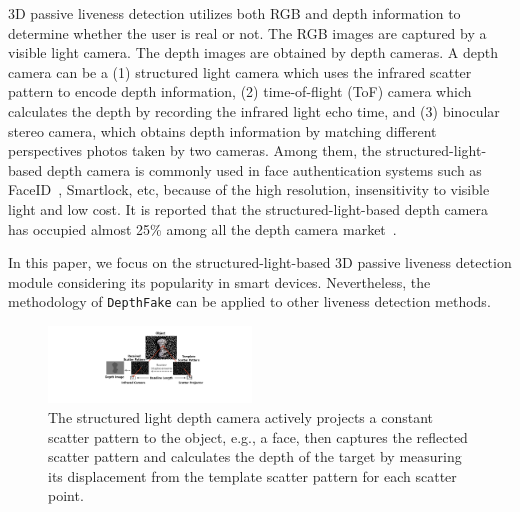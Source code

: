 3D passive liveness detection utilizes both RGB and depth information to determine whether the user is real or not.  The RGB images are captured by a visible light camera. The depth images are obtained by depth cameras. A depth camera can be a (1) structured light camera which uses the infrared scatter pattern to encode depth information, (2) time-of-flight (ToF) camera which calculates the depth by recording the infrared light echo time, and (3) binocular stereo camera, which obtains depth information by matching different perspectives photos taken by two cameras.
Among them, the structured-light-based depth camera is commonly used in face authentication systems such as FaceID~\cite{han2007face,bud2018facing}, Smartlock\cite{waseem2020face}, etc, because of the high resolution, insensitivity to visible light and low cost. It is reported that the structured-light-based depth camera has occupied almost 25\% among all the depth camera market~\cite{3dcameramarket}. 

In this paper, we focus on the structured-light-based 3D passive liveness detection module considering its popularity in smart devices. Nevertheless, the methodology of \texttt{DepthFake} can be applied to other liveness detection methods.

\begin{figure}[pt] 
	\centerline{\includegraphics[width = 0.48\textwidth]{figures/structured_light_camera.pdf}}
	\vspace{-0.1in}
	\caption{The structured light depth camera actively projects a constant scatter pattern to the object, e.g., a face, then captures the reflected scatter pattern and calculates the depth of the target by measuring its displacement from the template scatter pattern for each scatter point. }
	\label{depth_camera}
	\vspace{-0.15in}
\end{figure}


